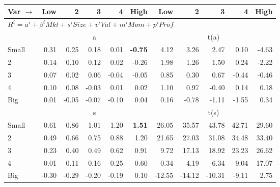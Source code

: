 
\begin{tabular}{lrrrrrrrrrr}
  \toprule
    
    Var $\rightarrow$ & Low & 2 & 3 & 4 & High & Low & 2 & 3 & 4 & High  \\ 
  \midrule
  \multicolumn{11}{l}{$R^i=a^i+\beta^iMkt+s^iSize+v^iVal+m^iMom+p^iProf$}  \\
  
     & \multicolumn{5}{c}{a} & \multicolumn{5}{c}{t(a)}   \\
     \cmidrule(r){2-6} \cmidrule(r){7-11} 
    Small  & 0.31  & 0.25  & 0.18  & 0.01  & \textbf{-0.75}  & 4.12  & 3.26  & 2.47  & 0.10  & -4.63   \\
    2  & 0.14  & 0.10  & 0.12  & 0.02  & -0.26  & 1.98  & 1.26  & 1.50  & 0.24  & -2.22   \\
    3  & 0.07  & 0.02  & 0.06  & -0.04  & -0.05  & 0.85  & 0.30  & 0.67  & -0.44  & -0.46   \\
    4  & 0.10  & 0.08  & -0.03  & 0.01  & 0.02  & 1.10  & 0.97  & -0.40  & 0.14  & 0.18   \\
    Big  & 0.01  & -0.05  & -0.07  & -0.10  & 0.04  & 0.16  & -0.78  & -1.11  & -1.55  & 0.34   \\
    
  
    
  
     & \multicolumn{5}{c}{s} & \multicolumn{5}{c}{t(s)}   \\
     \cmidrule(r){2-6} \cmidrule(r){7-11} 
    Small  & 0.61  & 0.86  & 1.01  & 1.20  & \textbf{1.51}  & 26.05  & 35.57  & 43.78  & 42.71  & 29.60   \\
    2  & 0.49  & 0.66  & 0.75  & 0.88  & 1.20  & 21.65  & 27.03  & 31.08  & 34.48  & 33.40   \\
    3  & 0.23  & 0.40  & 0.49  & 0.62  & 0.91  & 9.72  & 17.13  & 18.92  & 23.23  & 26.62   \\
    4  & 0.01  & 0.11  & 0.16  & 0.25  & 0.60  & 0.34  & 4.19  & 6.34  & 9.04  & 17.07   \\
    Big  & -0.30  & -0.29  & -0.20  & -0.19  & 0.10  & -12.55  & -14.12  & -10.31  & -9.11  & 2.75   \\
    

\end{tabular}
